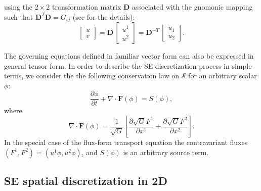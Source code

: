 \documentclass{agujournal}
\begin{document}
{ using the  $2 \times 2$ transformation matrix  $\mathbf{D}$ associated with the gnomonic mapping 
 such that   $\mathbf{D}^T\mathbf{D} = G_{ij}$ (see \cite{NTL2005MWR} for the details):  
    \begin{equation}
     \left[   \begin{array}{c}
               u \\ v
             \end{array}
           \right]
           =
     \mathbf{D}  \, \left[   \begin{array}{c}
               u^1 \\ u^2
             \end{array}
           \right] =
            \mathbf{D}^{-T}  \, \left[   \begin{array}{c}
               u_1 \\ u_2
             \end{array}
           \right]. 
          \label{eq:covcontra} 
\end{equation}

 The governing equations defined in familiar vector form can also be expressed 
 in  general tensor form. In order  to  describe the SE discretization process in simple terms, we consider the 
 the following conservation law  on $\mathcal{S}$ for an arbitrary  scalar $\phi$:  
 \begin{equation}
 \frac{\partial \phi }{\partial t}  + \nabla \cdot \mathbf{F}(\phi)  = S(\phi),
 \label{eq:se1} 
 \end{equation}
where 
\begin{equation}
   \nabla \cdot \mathbf{F}(\phi) = \frac{1}{\sqrt{G}} \left[   \frac{\partial  \sqrt{G} F^1}{\partial x^1}  + 
   \frac{\partial  \sqrt{G} F^2}{\partial x^2}      \right] .  
   \end{equation} 
In the special case of the flux-form transport equation the
   contravariant fluxes $(F^1, F^2) = (u^1 \phi , u^2 \phi)$, and $S(\phi)$  is an arbitrary source term.

  
\subsection{\normalsize SE spatial discretization in 2D}

}
\end{document}
